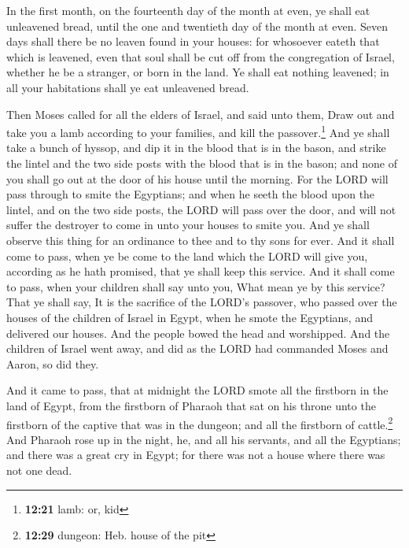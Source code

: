  In the first month, on the fourteenth day of the month
at even, ye shall eat unleavened bread, until the one and twentieth day
of the month at even.  Seven days shall there be no
leaven found in your houses: for whosoever eateth that which is
leavened, even that soul shall be cut off from the congregation of
Israel, whether he be a stranger, or born in the land. 
Ye shall eat nothing leavened; in all your habitations shall ye eat
unleavened bread.

 Then Moses called for all the elders of Israel, and said
unto them, Draw out and take you a lamb according to your families, and
kill the passover.\footnote{\textbf{12:21} lamb: or, kid}
 And ye shall take a bunch of hyssop, and dip it in the
blood that is in the bason, and strike the lintel and the two side posts
with the blood that is in the bason; and none of you shall go out at the
door of his house until the morning.  For the LORD will
pass through to smite the Egyptians; and when he seeth the blood upon
the lintel, and on the two side posts, the LORD will pass over the door,
and will not suffer the destroyer to come in unto your houses to smite
you.  And ye shall observe this thing for an ordinance to
thee and to thy sons for ever.  And it shall come to
pass, when ye be come to the land which the LORD will give you,
according as he hath promised, that ye shall keep this service.
 And it shall come to pass, when your children shall say
unto you, What mean ye by this service?  That ye shall
say, It is the sacrifice of the LORD's passover, who passed over the
houses of the children of Israel in Egypt, when he smote the Egyptians,
and delivered our houses. And the people bowed the head and worshipped.
 And the children of Israel went away, and did as the
LORD had commanded Moses and Aaron, so did they.

 And it came to pass, that at midnight the LORD smote all
the firstborn in the land of Egypt, from the firstborn of Pharaoh that
sat on his throne unto the firstborn of the captive that was in the
dungeon; and all the firstborn of cattle.\footnote{\textbf{12:29}
  dungeon: Heb. house of the pit}  And Pharaoh rose up in
the night, he, and all his servants, and all the Egyptians; and there
was a great cry in Egypt; for there was not a house where there was not
one dead.

